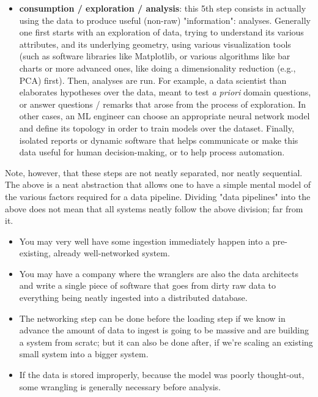 \documentclass{article}
\begin{document}
\begin{itemize}
\begin{itemize}
		\item \textbf{consumption / exploration / analysis}: this 5th step consists in actually using the data to produce useful (non-raw) "information": analyses. Generally one first starts with an exploration of data, trying to understand its various attributes, and its underlying geometry, using various visualization tools (such as software libraries like Matplotlib, or various algorithms like bar charts or more advanced ones, like doing a dimensionality reduction (e.g., PCA) first). Then, analyses are run. For example, a data scientist than elaborates hypotheses over the data, meant to test \textit{a priori} domain questions, or answer questions / remarks that arose from the process of exploration. In other cases, an ML engineer can choose an appropriate neural network model and define its topology in order to train models over the dataset. Finally, isolated reports or dynamic software that helps communicate or make this data useful for human decision-making, or to help process automation.
	\end{itemize}

	Note, however, that these steps are not neatly separated, nor neatly sequential. The above is a neat abstraction that allows one to have a simple mental model of the various factors required for a data pipeline. Dividing "data pipelines" into the above does not mean that all systems neatly follow the above division; far from it.

	\begin{itemize}

		\item You may very well have some ingestion immediately happen into a pre-existing, already well-networked system.
		\item You may have a company where the wranglers are also the data architects and write a single piece of software that goes from dirty raw data to everything being neatly ingested into a distributed database.
		\item The networking step can be done before the loading step if we know in advance the amount of data to ingest is going to be massive and are building a system from scratc; but it can also be done after, if we're scaling an existing small system into a bigger system.
		\item If the data is stored improperly, because the model was poorly thought-out, some wrangling is generally necessary before analysis.

	\end{itemize}


\end{itemize}
\end{document}
